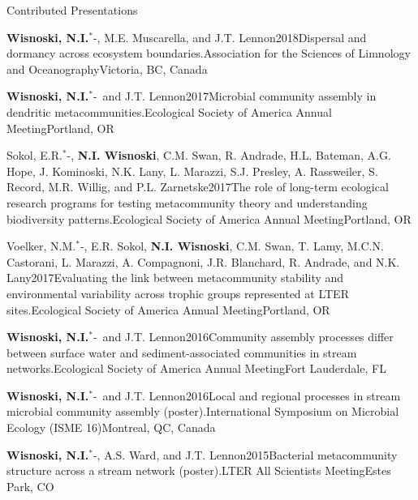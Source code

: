 \documentclass{resume} %
\newcommand{\Star}{\ensuremath{^*}\kern-\scriptspace}
\begin{document}
\begin{rhangSection}{Contributed Presentations}
\begin{Presentation}{{\bf Wisnoski, N.I.}\Star, M.E. Muscarella, and J.T. Lennon}{2018}{Dispersal and dormancy across ecosystem boundaries.}{Association for the Sciences of Limnology and Oceanography}{Victoria, BC, Canada}
\end{Presentation}

\begin{Presentation}{{\bf Wisnoski, N.I.}\Star\ and J.T. Lennon}{2017}{Microbial community assembly in dendritic metacommunities.}{Ecological Society of America Annual Meeting}{Portland, OR}
\end{Presentation}
  
\begin{Presentation}{Sokol, E.R.\Star, {\bf N.I. Wisnoski}, C.M. Swan, R. Andrade, H.L. Bateman, A.G. Hope, J. Kominoski, N.K. Lany, L. Marazzi, S.J. Presley, A. Rassweiler, S. Record, M.R. Willig, and P.L. Zarnetske}{2017}{The role of long-term ecological research programs for testing metacommunity theory and understanding biodiversity patterns.}{Ecological Society of America Annual Meeting}{Portland, OR}
\end{Presentation}
  
\begin{Presentation}{Voelker, N.M.\Star, E.R. Sokol, {\bf N.I. Wisnoski}, C.M. Swan, T. Lamy, M.C.N. Castorani, L. Marazzi, A. Compagnoni, J.R. Blanchard, R. Andrade, and N.K. Lany}{2017}{Evaluating the link between metacommunity stability and environmental variability across trophic groups represented at LTER sites.}{Ecological Society of America Annual Meeting}{Portland, OR}
\end{Presentation}

\begin{Presentation}{{\bf Wisnoski, N.I.}\Star\ and J.T. Lennon}{2016}{Community assembly processes differ between surface water and sediment-associated communities in stream networks.}{Ecological Society of America Annual Meeting}{Fort Lauderdale, FL}
\end{Presentation}

\begin{Presentation}{{\bf Wisnoski, N.I.}\Star\ and J.T. Lennon}{2016}{Local and regional processes in stream microbial community assembly (poster).}{International Symposium on Microbial Ecology (ISME 16)}{Montreal, QC, Canada}
\end{Presentation}

\begin{Presentation}{{\bf Wisnoski, N.I.}\Star, A.S. Ward, and J.T. Lennon}{2015}{Bacterial metacommunity structure across a stream network (poster).}{LTER All Scientists Meeting}{Estes Park, CO}
\end{Presentation}

\end{rhangSection}
\end{document}
